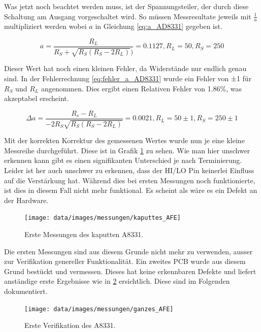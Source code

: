 Was jetzt noch beachtet werden muss, ist der Spannungsteiler, der durch diese Schaltung am Ausgang vorgeschaltet wird.
So müssen Messresultate jeweils mit $\frac{1}{a}$ multipliziert werden wobei $a$ in Gleichung \ref{eq:a_AD8331} gegeben ist.

\begin{equation}
    a = \frac{R_L}{R_S + \sqrt{R_S(R_S - 2R_L)})} = 0.1127, R_L =50, R_S = 250
    \label{eq:a_AD8331}
\end{equation}

Dieser Wert hat noch einen kleinen Fehler, da Widerstände nur endlich genau sind. In der Fehlerrechnung \ref{eq:fehler_a_AD8331} wurde ein Fehler von ±1 für $R_S$ und $R_L$ angenommen. Dies ergibt einen Relativen Fehler von 1.86\%, was akzeptabel erscheint.

\begin{equation}
    \Delta a = \frac{R_s - R_L}{-2R_S\sqrt{R_S(R_S - 2R_L)}} = 0.0021, R_L = 50±1, R_S = 250±1
    \label{eq:fehler_a_AD8331}
\end{equation}

Mit der korrekten Korrektur des gemessenen Wertes wurde nun je eine kleine Messreihe durchgeführt. Diese ist in Grafik \ref{fig:kaputtes_AFE} zu sehen. Wie man hier unschwer erkennen kann gibt es einen signifikanten Unterschied je nach Terminierung.
Leider ist her auch unschwer zu erkennen, dass der HI/LO Pin keinerlei Einfluss auf die Verstärkung hat. Während dies bei ersten Messungen noch funktionierte, ist dies in diesem Fall nicht mehr funktional. Es scheint als wäre es ein Defekt an der Hardware.

\begin{figure}[H]
\begin{center}
    \texttt{[image: data/images/messungen/kaputtes\_AFE]}
    \caption{Erste Messungen des kaputten A8331.}
    \label{fig:kaputtes_AFE}
\end{center}
\end{figure}

Die ersten Messungen sind aus diesem Grunde nicht mehr zu verwenden, ausser zur Verifikation genereller Funktionalität. Ein zweites PCB wurde aus diesem Grund bestückt und vermessen. Dieses hat keine erkennbaren Defekte und liefert anständige erste Ergebnisse wie in \ref{fig:ganzes_AFE} ersichtlich. Diese sind im Folgenden dokumentiert.

\begin{figure}[H]
\begin{center}
    \texttt{[image: data/images/messungen/ganzes\_AFE]}
    \caption{Erste Verifikation des A8331.}
    \label{fig:ganzes_AFE}
\end{center}
\end{figure}

